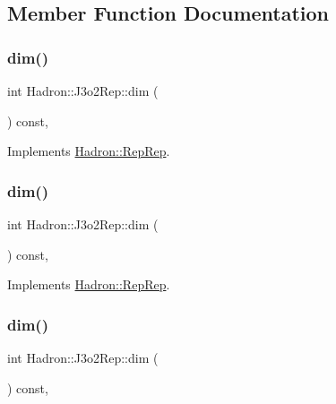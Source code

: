 \subsection{Member Function Documentation}
\mbox{\label{structHadron_1_1J3o2Rep_a119556341b3fb8bfb4615b3798973c9c}} 
\subsubsection{\texorpdfstring{dim()}{dim()}\hspace{0.1cm}{\footnotesize\ttfamily [1/5]}}
{\footnotesize\ttfamily int Hadron\+::\+J3o2\+Rep\+::dim (\begin{DoxyParamCaption}{ }\end{DoxyParamCaption}) const\hspace{0.3cm}{\ttfamily [inline]}, {\ttfamily [virtual]}}



Implements \mbox{\hyperlink{structHadron_1_1RepRep_a92c8802e5ed7afd7da43ccfd5b7cd92b}{Hadron\+::\+Rep\+Rep}}.

\mbox{\label{structHadron_1_1J3o2Rep_a119556341b3fb8bfb4615b3798973c9c}} 
\subsubsection{\texorpdfstring{dim()}{dim()}\hspace{0.1cm}{\footnotesize\ttfamily [2/5]}}
{\footnotesize\ttfamily int Hadron\+::\+J3o2\+Rep\+::dim (\begin{DoxyParamCaption}{ }\end{DoxyParamCaption}) const\hspace{0.3cm}{\ttfamily [inline]}, {\ttfamily [virtual]}}



Implements \mbox{\hyperlink{structHadron_1_1RepRep_a92c8802e5ed7afd7da43ccfd5b7cd92b}{Hadron\+::\+Rep\+Rep}}.

\mbox{\label{structHadron_1_1J3o2Rep_a119556341b3fb8bfb4615b3798973c9c}} 
\subsubsection{\texorpdfstring{dim()}{dim()}\hspace{0.1cm}{\footnotesize\ttfamily [3/5]}}
{\footnotesize\ttfamily int Hadron\+::\+J3o2\+Rep\+::dim (\begin{DoxyParamCaption}{ }\end{DoxyParamCaption}) const\hspace{0.3cm}{\ttfamily [inline]}, {\ttfamily [virtual]}}



